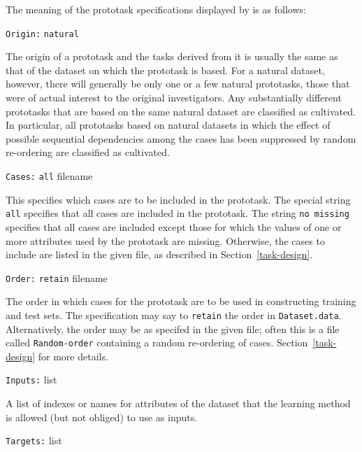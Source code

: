 The meaning of the prototask specifications displayed by \dinfo{} is as 
follows:\vspace{-5pt}
\begin{list}{}{%
\setlength{\leftmargin}{1.1in}%
\setlength{\labelwidth}{0.7in}%
\setlength{\labelsep}{0.1in}%
}
\item[{\tt Origin:}\hfill]
   {\tt natural}   

The origin of a prototask and the tasks derived from it is usually the
same as that of the dataset on which the prototask is based.  For a
natural dataset, however, there will generally be only one or a few
natural prototasks, those that were of actual interest to the original
investigators.  Any substantially different prototasks that are based
on the same natural dataset are classified as cultivated. In
particular, all prototasks based on natural datasets in which the
effect of possible sequential dependencies among the cases has been
suppressed by random re-ordering are classified as cultivated.

\item[{\tt Cases:}\hfill]
   {\tt all}  \OR filename

This specifies which cases are to be included in the prototask.  The
special string \texttt{all} specifies that all cases are included in
the prototask.  The string \mbox{\texttt{no missing}} specifies that
all cases are included except those for which the values of one or
more attributes used by the prototask are missing.  Otherwise, the
cases to include are listed in the given file, as described in
Section~\ref{task-design}.


\item[{\tt Order:}\hfill]
   {\tt retain} \OR filename

The order in which cases for the prototask are to be used in
constructing training and test sets.  The specification may say to
\texttt{retain} the order in \texttt{Dataset.data}.  Alternatively,
the order may be as specifed in the given file; often this is
a file called \texttt{Random-order} containing a random re-ordering of 
cases. Section~\ref{task-design} for more details.

\item[{\tt Inputs:}\hfill] list

A list of indexes or names for attributes of the dataset that the
learning method is allowed (but not obliged) to use as inputs.

\item[{\tt Targets:}\hfill] list


\end{list}
